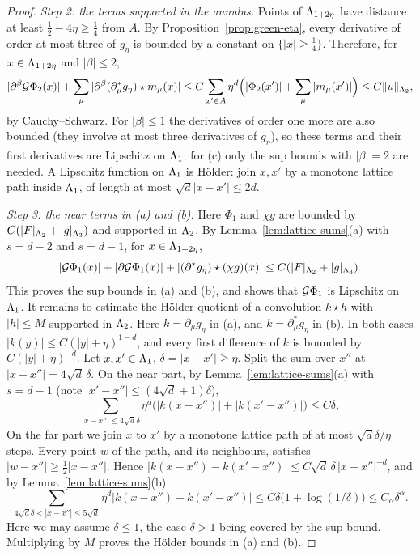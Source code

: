 \begin{proof}
\emph{Step 2: the terms supported in the annulus.} Points of $\Lambda_{1+2\eta}$ have distance at least $\frac12-4\eta\ge\frac14$ from $A$. By Proposition~\ref{prop:green-eta}, every derivative of order at most three of $g_\eta$ is bounded by a constant on $\{|x|\ge\frac14\}$. Therefore, for $x\in\Lambda_{1+2\eta}$ and $|\beta|\le2$,
\[
|\partial^\beta\mathcal G\Phi_2(x)|+\sum_\mu|\partial^\beta(\partial^*_\mu g_\eta)\star m_\mu(x)|\le C\sum_{x'\in A}\eta^d\Big(|\Phi_2(x')|+\sum_\mu|m_\mu(x')|\Big)\le C\|u\|_{\Lambda_2},
\]
by Cauchy--Schwarz. For $|\beta|\le1$ the derivatives of order one more are also bounded (they involve at most three derivatives of $g_\eta$), so these terms and their first derivatives are Lipschitz on $\Lambda_1$; for (c) only the sup bounds with $|\beta|=2$ are needed. A Lipschitz function on $\Lambda_1$ is H\"older: join $x,x'$ by a monotone lattice path inside $\Lambda_1$, of length at most $\sqrt d|x-x'|\le2d$.

\emph{Step 3: the near terms in (a) and (b).} Here $\Phi_1$ and $\chi g$ are bounded by $C(|F|_{\Lambda_2}+|g|_{\Lambda_3})$ and supported in $\Lambda_2$. By Lemma~\ref{lem:lattice-sums}(a) with $s=d-2$ and $s=d-1$, for $x\in\Lambda_{1+2\eta}$,
\[
|\mathcal G\Phi_1(x)|+|\partial\mathcal G\Phi_1(x)|+|(\partial^*g_\eta)\star(\chi g)(x)|\le C(|F|_{\Lambda_2}+|g|_{\Lambda_3}).
\]
This proves the sup bounds in (a) and (b), and shows that $\mathcal G\Phi_1$ is Lipschitz on $\Lambda_1$. It remains to estimate the H\"older quotient of a convolution $k\star h$ with $|h|\le M$ supported in $\Lambda_2$. Here $k=\partial_\mu g_\eta$ in (a), and $k=\partial^*_\mu g_\eta$ in (b). In both cases $|k(y)|\le C(|y|+\eta)^{1-d}$, and every first difference of $k$ is bounded by $C(|y|+\eta)^{-d}$. Let $x,x'\in\Lambda_1$, $\delta=|x-x'|\ge\eta$. Split the sum over $x''$ at $|x-x''|=4\sqrt d\,\delta$. On the near part, by Lemma~\ref{lem:lattice-sums}(a) with $s=d-1$ (note $|x'-x''|\le(4\sqrt d+1)\delta$),
\[
\sum_{|x-x''|\le4\sqrt d\delta}\eta^d\big(|k(x-x'')|+|k(x'-x'')|\big)\le C\delta ,
\]
On the far part we join $x$ to $x'$ by a monotone lattice path of at most $\sqrt d\delta/\eta$ steps. Every point $w$ of the path, and its neighbours, satisfies $|w-x''|\ge\frac12|x-x''|$. Hence $|k(x-x'')-k(x'-x'')|\le C\sqrt d\,\delta\,|x-x''|^{-d}$, and by Lemma~\ref{lem:lattice-sums}(b)
\[
\sum_{4\sqrt d\delta<|x-x''|\le5\sqrt d}\eta^d|k(x-x'')-k(x'-x'')|\le C\delta\big(1+\log(1/\delta)\big)\le C_\alpha\delta^\alpha .
\]
Here we may assume $\delta\le1$, the case $\delta>1$ being covered by the sup bound. Multiplying by $M$ proves the H\"older bounds in (a) and (b).


\end{proof}

